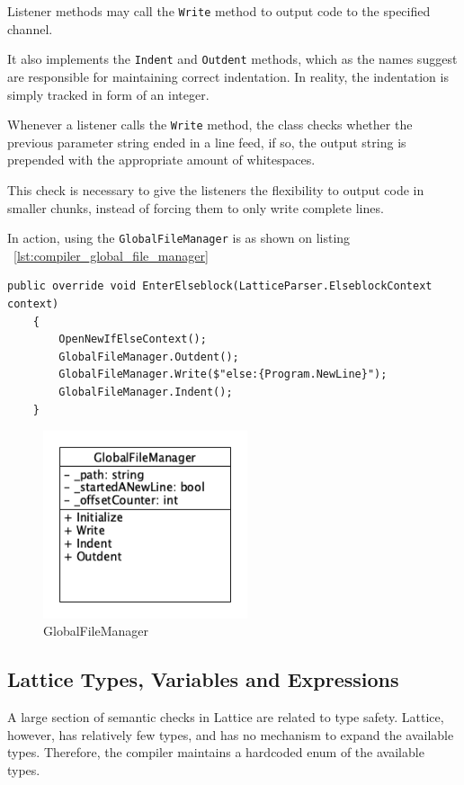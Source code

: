 Listener methods may call the \lstinline{Write} method to output code to the specified channel.

It also implements the \lstinline{Indent} and \lstinline{Outdent} methods, which as the names suggest are responsible
for maintaining correct indentation.
In reality, the indentation is simply tracked in form of an integer.

Whenever a listener calls the \lstinline{Write} method, the class checks whether the previous parameter string ended
in a line feed, if so, the output string is prepended with the appropriate amount of whitespaces.

This check is necessary to give the listeners the flexibility to output code in smaller chunks, instead of forcing
them to only write complete lines.

In action, using the \lstinline{GlobalFileManager} is as shown on listing ~\ref{lst:compiler_global_file_manager}

\begin{lstlisting}[caption={Using the GlobalFileManager to enter an else block},captionpos=b, label={lst:compiler_global_file_manager}]
    public override void EnterElseblock(LatticeParser.ElseblockContext context)
    {
        OpenNewIfElseContext();
        GlobalFileManager.Outdent();
        GlobalFileManager.Write($"else:{Program.NewLine}");
        GlobalFileManager.Indent();
    }
\end{lstlisting}

\begin{figure}[H]
    \centering
    \includegraphics[width=6cm]{figures/implementation_section/globalfilemanager}
    \caption{GlobalFileManager}
    \label{fig:global_file_manager}
\end{figure}

\subsection{Lattice Types, Variables and Expressions}
A large section of semantic checks in Lattice are related to type safety.
Lattice, however, has relatively few types, and has no mechanism to expand the available types.
Therefore, the compiler maintains a hardcoded enum of the available types.

